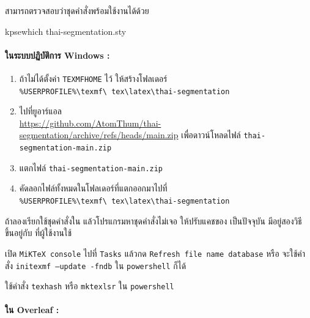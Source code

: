 สามารถตรวจสอบว่าชุดคำสั่งพร้อมใช้งานได้ด้วย
\begin{bashsource}{}
kpsewhich thai-segmentation.sty
\end{bashsource}

\paragraph{ในระบบปฏิบัติการ Windows :}

\begin{enumerate}
  \item ถ้าไม่ได้ตั้งค่า \texttt{TEXMFHOME} ไว้ ให้สร้างโฟลเดอร์ \\
        \texttt{\%USERPROFILE\%\textbackslash texmf\textbackslash
          tex\textbackslash latex\textbackslash thai-segmentation}
  \item ไปที่ยูอาร์แอล \\
        \url{https://github.com/AtomThum/thai-segmentation/archive/refs/heads/main.zip}
        เพื่อดาวน์โหลดไฟล์ \texttt{thai-segmentation-main.zip}
  \item แตกไฟล์ \texttt{thai-segmentation-main.zip}
  \item คัดลอกไฟล์ทั้งหมดในโฟลเดอร์ที่แตกออกมาไปที่ \\
        \texttt{\%USERPROFILE\%\textbackslash texmf\textbackslash
          tex\textbackslash latex\textbackslash thai-segmentation}
\end{enumerate}

ถ้าลองเรียกใช้ชุดคำสั่งใน \latexlogo แล้วโปรแกรมหาชุดคำสั่งไม่เจอ ให้ปรับแคชของ
\latexlogo เป็นปัจจุบัน มีอยู่สองวิธี ขึ้นอยู่กับ \latexlogo ที่ผู้ใช้งานใช้

\begin{description}[font=\ttfamily\bfseries]
  \item[MiKTeX] เปิด \texttt{MiKTeX console} ไปที่ \texttt{Tasks} แล้วกด
        \texttt{Refresh file name database} หรือ จะใช้คำสั่ง
        \texttt{initexmf --update -fndb} ใน \texttt{powershell} ก็ได้
  \item[TeX Live] ใช้คำสั่ง \texttt{texhash} หรือ \texttt{mktexlsr} ใน
        \texttt{powershell}
\end{description}

\paragraph{ใน Overleaf :}

